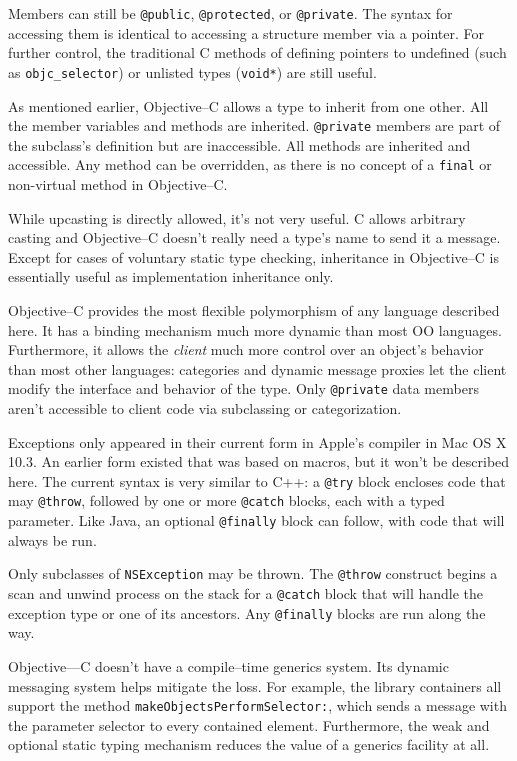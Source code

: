 	Members can still be \texttt{@public}, \texttt{@protected}, or \texttt{@private}.  The syntax for accessing them is identical to accessing a structure member via a pointer.  For further control, the traditional C methods of defining pointers to undefined (such as \texttt{objc\_selector}) or unlisted types (\texttt{void*}) are still useful.  

	As mentioned earlier, Objective--C allows a type to inherit from one other.  All the member variables and methods are inherited.  \texttt{@private} members are part of the subclass's definition but are inaccessible.  All methods are inherited and accessible.  Any method can be overridden, as there is no concept of a \texttt{final} or non-virtual method in Objective--C.

	While upcasting is directly allowed, it's not very useful.  C allows arbitrary casting and Objective--C doesn't really need a type's name to send it a message.  Except for cases of voluntary static type checking, inheritance in Objective--C is essentially useful as implementation inheritance only.

	Objective--C provides the most flexible polymorphism of any language described here. It has a binding mechanism much more dynamic than most OO languages.  Furthermore, it allows the \emph{client} much more control over an object's behavior than most other languages: categories and dynamic message proxies let the client modify the interface and behavior of the type.  Only \texttt{@private} data members aren't accessible to client code via subclassing or categorization.

	Exceptions only appeared in their current form in Apple's compiler in Mac OS X 10.3.  An earlier form existed that was based on macros, but it won't be described here.  The current syntax is very similar to C++: a \texttt{@try} block encloses code that may \texttt{@throw}, followed by one or more \texttt{@catch} blocks, each with a typed parameter.  Like Java, an optional \texttt{@finally} block can follow, with code that will always be run.

	Only subclasses of \texttt{NSException} may be thrown.  The \texttt{@throw} construct begins a scan and unwind process on the stack for a \texttt{@catch} block that will handle the exception type or one of its ancestors.  Any \texttt{@finally} blocks are run along the way.

	Objective---C doesn't have a compile--time generics system.  Its dynamic messaging system helps mitigate the loss.  For example, the library containers all support the method \texttt{makeObjectsPerformSelector:}, which sends a message with the parameter selector to every contained element.  Furthermore, the weak and optional static typing mechanism reduces the value of a generics facility at all.

